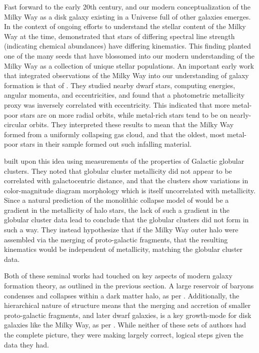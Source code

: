 Fast forward to the early 20th century, and our modern conceptualization of the Milky Way as a disk galaxy existing in a Universe full of other galaxies emerges. In the context of ongoing efforts to understand the stellar content of the Milky Way at the time, \textcite{roman50} demonstrated that stars of differing spectral line strength (indicating chemical abundances) have differing kinematics. This finding planted one of the many seeds that have blossomed into our modern understanding of the Milky Way as a collection of unique stellar populations. An important early work that integrated observations of the Milky Way into our understanding of galaxy formation is that of \textcite{eggen62}. They studied nearby dwarf stars, computing energies, angular momenta, and eccentricities, and found that a photometric metallicity proxy was inversely correlated with eccentricity. This indicated that more metal-poor stars are on more radial orbits, while metal-rich stars tend to be on nearly-circular orbits. They interpreted these results to mean that the Milky Way formed from a uniformly collapsing gas cloud, and that the oldest, most metal-poor stars in their sample formed out such infalling material.

\textcite{searle78} built upon this idea using measurements of the properties of Galactic globular clusters. They noted that globular cluster metallicity did not appear to be correlated with galactocentric distance, and that the clusters show variations in color-magnitude diagram morphology which is itself uncorrelated with metallicity. Since a natural prediction of the monolithic collapse model of \textcite{eggen62} would be a gradient in the metallicity of halo stars, the lack of such a gradient in the globular cluster data lead \textcite{searle78} to conclude that the globular clusters did not form in such a way. They instead hypothesize that if the Milky Way outer halo were assembled via the merging of proto-galactic fragments, that the resulting kinematics would be independent of metallicity, matching the globular cluster data.

Both of these seminal works had touched on key aspects of modern galaxy formation theory, as outlined in the previous section. A large reservoir of baryons condenses and collapses within a dark matter halo, as per \textcite{eggen62}. Additionally, the hierarchical nature of structure means that the merging and accretion of smaller proto-galactic fragments, and later dwarf galaxies, is a key growth-mode for disk galaxies like the Milky Way, as per \textcite{searle78}. While neither of these sets of authors had the complete picture, they were making largely correct, logical steps given the data they had.


